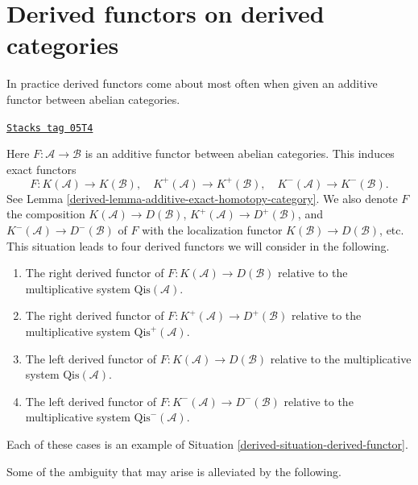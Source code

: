 \section{Derived functors on derived categories}
\label{derived-section-derived-functors-classical}
In practice derived functors come about most often when given an
additive functor between abelian categories.

\begin{definition}
\label{derived-situation-classical}
\href{https://stacks.math.columbia.edu/tag/05T4}{\texttt{Stacks tag 05T4}}

Here $F : \mathcal{A} \to \mathcal{B}$ is an additive functor between
abelian categories. This induces exact functors
$$
F : K(\mathcal{A}) \to K(\mathcal{B}), \quad
K^{+}(\mathcal{A}) \to K^{+}(\mathcal{B}), \quad
K^{-}(\mathcal{A}) \to K^{-}(\mathcal{B}).
$$
See Lemma \ref{derived-lemma-additive-exact-homotopy-category}.
We also denote $F$ the composition $K(\mathcal{A}) \to D(\mathcal{B})$,
$K^{+}(\mathcal{A}) \to D^{+}(\mathcal{B})$, and
$K^{-}(\mathcal{A}) \to D^-(\mathcal{B})$ of $F$ with the localization
functor $K(\mathcal{B}) \to D(\mathcal{B})$, etc. This situation leads
to four derived functors we will consider in the following.
\begin{enumerate}
\item The right derived functor of
$F : K(\mathcal{A}) \to D(\mathcal{B})$
relative to the multiplicative system $\text{Qis}(\mathcal{A})$.
\item The right derived functor of
$F : K^{+}(\mathcal{A}) \to D^{+}(\mathcal{B})$
relative to the multiplicative system $\text{Qis}^{+}(\mathcal{A})$.
\item The left derived functor of
$F : K(\mathcal{A}) \to D(\mathcal{B})$
relative to the multiplicative system $\text{Qis}(\mathcal{A})$.
\item The left derived functor of
$F : K^{-}(\mathcal{A}) \to D^{-}(\mathcal{B})$
relative to the multiplicative system $\text{Qis}^-(\mathcal{A})$.
\end{enumerate}
Each of these cases is an example of
Situation \ref{derived-situation-derived-functor}.
\end{definition}

Some of the ambiguity that may arise is alleviated by the following.

